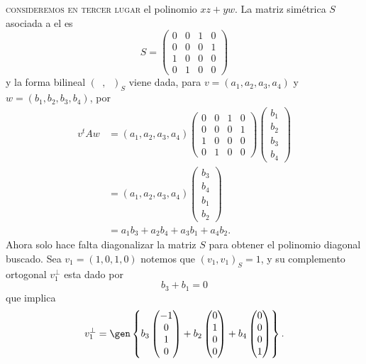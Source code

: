 \documentclass[twocolumn]{notasdeclase}
\newcommand{\Bform}{(\phantom{a},\phantom{a})}
\newcommand{\bform}[2]{(#1,#2)}
\begin{document}
\begin{sol}
\textsc{consideremos en tercer lugar} el polinomio $xz+yw$. La matriz simétrica $S$ asociada a el es
\[ S = \begin{pmatrix}
0 & 0 & 1 & 0 \\
0 & 0 & 0 & 1 \\
1 & 0 & 0 & 0 \\
0 & 1 & 0 & 0
\end{pmatrix} \]
y la forma bilineal $\Bform_S$ viene dada,  para $v=(a_1,a_2,a_3,a_4)$ y $w=(b_1,b_2,b_3,b_4)$, por
\begin{align*}
v^tAw &= (a_1,a_2,a_3,a_4)  \begin{pmatrix}
0 & 0 & 1 & 0 \\
0 & 0 & 0 & 1 \\
1 & 0 & 0 & 0 \\
0 & 1 & 0 & 0
\end{pmatrix} \begin{pmatrix}
b_1 \\ b_2 \\ b_3 \\ b_4
\end{pmatrix} \\
&= (a_1,a_2,a_3,a_4)  \begin{pmatrix}
b_3 \\ b_4 \\ b_1\\ b_2 
\end{pmatrix} \\
&= a_1b_3 + a_2b_4 + a_3b_1 + a_4b_2.
\end{align*}
Ahora solo hace falta diagonalizar la matriz $S$ para obtener el polinomio diagonal buscado. Sea $v_1 = (1,0,1,0)$ notemos que $\bform{v_1}{v_1}_S = 1$, y su complemento ortogonal $v_1^\perp$ esta dado por
\[ b_3+b_1 = 0 \]
que implica
\[ v_1^\perp = \gen \left\{ b_3\begin{pmatrix}
-1 \\ 0 \\ 1 \\ 0
\end{pmatrix}+ b_2\begin{pmatrix}
0 \\ 1 \\ 0 \\ 0
\end{pmatrix}+b_4\begin{pmatrix}
0 \\ 0 \\ 0 \\ 1
\end{pmatrix} \right\}. \]

\end{sol}
\end{document}
